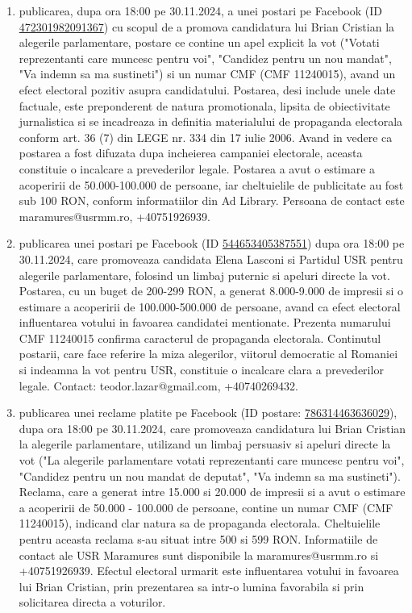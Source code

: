 \documentclass[a4paper,12pt]{article}
\begin{document}
\begin{enumerate}[leftmargin=*, label=\arabic*.)]
    \item publicarea, dupa ora 18:00 pe 30.11.2024, a unei postari pe Facebook (ID \href{https://www.facebook.com/ads/library/?id=472301982091367}{472301982091367}) cu scopul de a promova candidatura lui Brian Cristian la alegerile parlamentare,  postare ce contine un apel explicit la vot ("Votati reprezentanti care muncesc pentru voi", "Candidez pentru un nou mandat", "Va indemn sa ma sustineti") si un numar CMF (CMF 11240015),  avand un efect electoral pozitiv asupra candidatului.  Postarea, desi include unele date factuale, este preponderent de natura promotionala, lipsita de obiectivitate jurnalistica si se incadreaza in definitia materialului de propaganda electorala conform art. 36 (7) din LEGE nr. 334 din 17 iulie 2006.  Avand in vedere ca postarea a fost difuzata dupa incheierea campaniei electorale, aceasta constituie o incalcare a prevederilor legale.  Postarea a avut o estimare a acoperirii de 50.000-100.000 de persoane, iar cheltuielile de publicitate au fost sub 100 RON, conform informatiilor din Ad Library.  Persoana de contact este maramures@usrmm.ro, +40751926939.
    \item publicarea unei postari pe Facebook (ID \href{https://www.facebook.com/ads/library/?id=544653405387551}{544653405387551}) dupa ora 18:00 pe 30.11.2024, care promoveaza candidata Elena Lasconi si Partidul USR pentru alegerile parlamentare, folosind un limbaj puternic si apeluri directe la vot. Postarea, cu un buget de 200-299 RON, a generat 8.000-9.000 de impresii si o estimare a acoperirii de 100.000-500.000 de persoane, avand ca efect electoral influentarea votului in favoarea candidatei mentionate. Prezenta numarului CMF 11240015 confirma caracterul de propaganda electorala.  Continutul postarii, care face referire la miza alegerilor, viitorul democratic al Romaniei si indeamna la vot pentru USR, constituie o incalcare clara a prevederilor legale.  Contact: teodor.lazar@gmail.com, +40740269432.
    \item publicarea unei reclame platite pe Facebook (ID postare: \href{https://www.facebook.com/ads/library/?id=786314463636029}{786314463636029}), dupa ora 18:00 pe 30.11.2024, care promoveaza candidatura lui Brian Cristian la alegerile parlamentare,  utilizand un limbaj persuasiv si apeluri directe la vot ("La alegerile parlamentare votati reprezentanti care muncesc pentru voi", "Candidez pentru un nou mandat de deputat", "Va indemn sa ma sustineti").  Reclama, care a generat intre 15.000 si 20.000 de impresii si a avut o estimare a acoperirii de 50.000 - 100.000 de persoane,  contine un numar CMF (CMF 11240015), indicand clar natura sa de propaganda electorala.  Cheltuielile pentru aceasta reclama s-au situat intre 500 si 599 RON.  Informatiile de contact ale USR Maramures sunt disponibile la maramures@usrmm.ro si +40751926939.  Efectul electoral urmarit este influentarea votului in favoarea lui Brian Cristian, prin prezentarea sa intr-o lumina favorabila si prin solicitarea directa a voturilor.

\end{enumerate}
\end{document}
